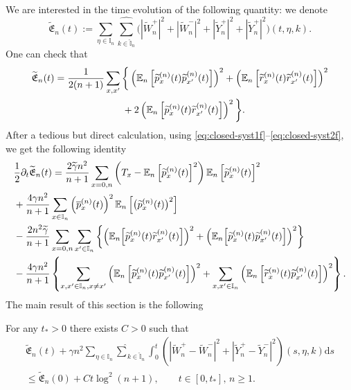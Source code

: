 \documentclass[EJP]{ejpecp} %
\newcommand{\mf}[1]{{\mathfrak #1}}
\newcommand\E{{\mathbb E}}
\newcommand\T{{\mathbb I}}
\newcommand \ga{\gamma}
\renewcommand{\ge}{\geqslant}
\renewcommand{\le}{\leqslant}
\newcommand{\dd  }{\mathrm{d}}
\renewcommand{\hat}{\widehat}
\renewcommand{\tilde}{\widetilde}
\renewcommand{\bar}{\overline}
\numberwithin{equation}{section}
\begin{document}
We are interested in the time evolution of the following quantity: we denote 
\begin{equation}
\label{eq:energy1f}
\tilde{\mf E}_n(t):=\sum_{\eta\in\T_n}\underset{{k\in \widehat{\T}_n}}{{\hat\sum}}
\big(|\tilde W_n^+|^2+|\tilde W_n^-|^2 + |\tilde Y_n^+|^2+|\tilde Y_n^+|^2 \big)(t,\eta,k).\end{equation}
One can check that
\begin{align*} \tilde{\mf E}_n(t) 
&=\frac 1{2(n+1)} 
\sum_{x,x'}\bigg\{\left(\mathbb E_n\left[ \tilde p_x^{(n)}(t)
  \tilde p_{x'}^{(n)}(t)\right] \right)^2+\left(\mathbb E_n\left[ \tilde r_x^{(n)}(t)
  \tilde r_{x'}^{(n)}(t)\right] \right)^2 \notag \\ & \quad \qquad \qquad \qquad +2 \left (\mathbb E_n\left[ \tilde p_x^{(n)}(t)
  \tilde r_{x'}^{(n)}(t)\right] \right)^2\bigg\}.\notag
\end{align*}
After a tedious but direct calculation, using \eqref{eq:closed-syst1f}--\eqref{eq:closed-syst2f}, we get the following identity
\begin{align}
\label{energy-evol3ff}
&\frac12 \partial_t \tilde{\mf E}_n(t) 
=   \frac{2\tilde \ga n^2}{n+1} \sum_{x=0,n}\left(T_x-\E_n\left[\tilde p_x^{(n)}(t)\right]^2\right)\E_n\left[\tilde p_x^{(n)}(t)\right]^2 \notag\\ & +\frac{4\ga n^2}{n+1}\sum_{x\in\T_n}\left(\bar p_x^{(n)}(t)\right)^2\E_n\left[ \big(\tilde p_x^{(n)}(t)\big)^2\right]\nonumber
\\
&
-\frac{2n^2 \tilde\gamma}{n+1}\sum_{x=0,n}\sum_{x'\in\T_n}\left\{
  \left(\E_n\Big[\tilde p_{x}^{(n)}(t)\tilde  r_{x'}^{(n)}(t)\Big]\right)^2
+\left(\E_n\Big[\tilde p_{x}^{(n)}(t) \tilde p_{x'}^{(n)}(t)\Big]\right)^2 \right\}\notag\\
&
-\frac{4\ga
  n^2}{n+1}\left\{\sum_{x,x'\in\T_n,x\not=x'}\left(\E_n\left[\tilde p_x^{(n)}(t)\tilde p_{x'}^{(n)}(t)\right]\right)^2
 +
\sum_{x,x'\in\T_n}\left(\mathbb E_n\left[ \tilde  r_{x}^{(n)}(t) \tilde p_{x'}^{(n)}(t)\right]\right)^2\right\}.
\end{align}
%
The main result of this section is the following
\begin{proposition}
\label{thm020411-19}
For any $t_*>0$ there exists $C>0$ such that 
\begin{multline}
\label{020511-19}
\tilde{\mf E}_n(t)+\ga n^2\sum_{\eta\in\T_n}\underset{{k\in \widehat{\T}_n}}{{\hat\sum}}\int_0^t\left(\left|\tilde W^+_n -\tilde W^-_n \right|^2+\left|\tilde Y^+_n -\tilde Y^-_n
  \right|^2\right)(s,\eta,k)\dd s \\
\le \tilde{\mf E}_n(0) +Ct\log^2(n+1),\qquad t\in[0,t_*],\,n\ge 1.
\end{multline}
\end{proposition}
\end{document}
